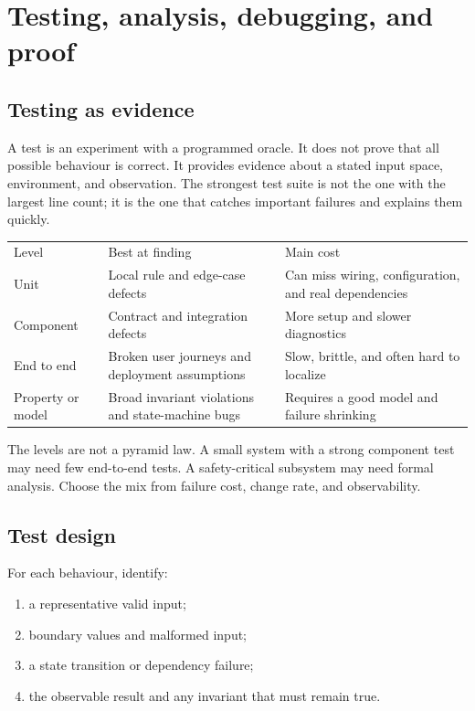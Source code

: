 \chapter{Testing, analysis, debugging, and proof}

\section{Testing as evidence}
A test is an experiment with a programmed oracle. It does not prove that all
possible behaviour is correct. It provides evidence about a stated input space,
environment, and observation. The strongest test suite is not the one with the
largest line count; it is the one that catches important failures and explains
them quickly.

\noindent\begin{tabularx}{\textwidth}{@{}p{}p{}X@{}}
\toprule
Level & Best at finding & Main cost \\
Unit & Local rule and edge-case defects & Can miss wiring, configuration, and real dependencies \\
Component & Contract and integration defects & More setup and slower diagnostics \\
End to end & Broken user journeys and deployment assumptions & Slow, brittle, and often hard to localize \\
Property or model & Broad invariant violations and state-machine bugs & Requires a good model and failure shrinking \\
\bottomrule
\end{tabularx}

The levels are not a pyramid law. A small system with a strong component test may
need few end-to-end tests. A safety-critical subsystem may need formal analysis.
Choose the mix from failure cost, change rate, and observability.

\section{Test design}
For each behaviour, identify:

\begin{enumerate}
  \item a representative valid input;
  \item boundary values and malformed input;
  \item a state transition or dependency failure;
  \item the observable result and any invariant that must remain true.
\end{enumerate}

